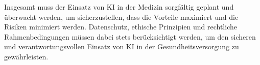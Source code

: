 Insgesamt muss der Einsatz von KI in der Medizin sorgfältig geplant und überwacht werden, um sicherzustellen, dass die Vorteile maximiert und die Risiken minimiert werden. 
Datenschutz, ethische Prinzipien und rechtliche Rahmenbedingungen müssen dabei stets berücksichtigt werden, um den sicheren und verantwortungsvollen Einsatz von KI in der Gesundheitsversorgung zu gewährleisten.